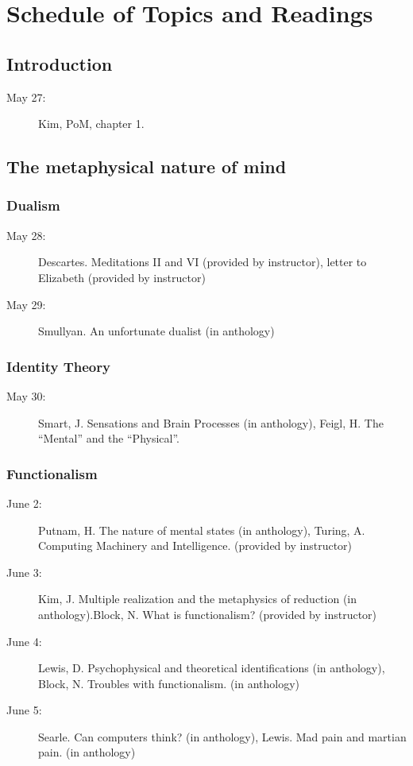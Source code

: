 \documentclass[11pt]{article}
\begin{document}
\section{Schedule of Topics and Readings}
\subsection*{Introduction}
\begin{description}
\item[May 27:] Kim, PoM, chapter 1.
\end{description}

\subsection{The metaphysical nature of mind}
\subsubsection{Dualism}
\begin{description}
\item[May 28:] Descartes. Meditations II and VI (provided by instructor), letter to Elizabeth (provided by instructor)
\item [May 29:] Smullyan. An unfortunate dualist (in anthology)
\end{description}

\subsubsection{Identity Theory}
\begin{description}
\item[May 30:] Smart, J. Sensations and Brain Processes (in anthology), Feigl, H. The ``Mental'' and the ``Physical''.
\end{description}

\subsubsection{Functionalism}
\begin{description}
\item [June 2:] Putnam, H. The nature of mental states (in anthology), Turing, A. Computing Machinery and Intelligence. (provided by instructor)
\item [June 3:] Kim, J. Multiple realization and the metaphysics of reduction (in anthology).Block, N. What is functionalism? (provided by instructor)
\item [June 4:] Lewis, D. Psychophysical and theoretical identifications (in anthology), Block, N. Troubles with functionalism. (in anthology)
\item [June 5:] Searle. Can computers think? (in anthology), Lewis. Mad pain and martian pain. (in anthology)
\end{description}
\end{document}
